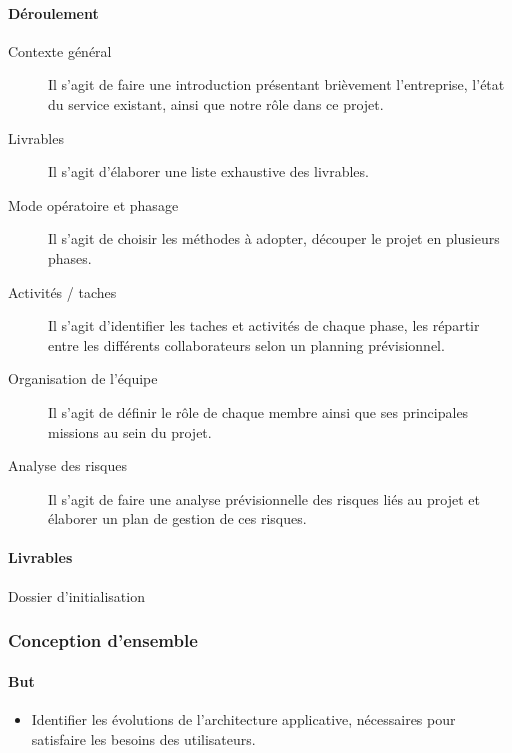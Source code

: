 \paragraph{Déroulement}
\begin{description}
    \item[Contexte général]{
        Il s’agit de faire une introduction présentant brièvement l’entreprise, l’état du service existant, ainsi que notre rôle dans ce projet.
    }
    \item[Livrables]{
        Il s’agit d’élaborer une liste exhaustive des livrables.
    }
    \item[Mode opératoire et phasage]{
        Il s’agit de choisir les méthodes à adopter, découper le projet en plusieurs phases.
    }
    \item[Activités / taches]{
        Il s’agit d’identifier les taches et activités de chaque phase, les répartir entre les différents collaborateurs selon un planning prévisionnel.
    }
    \item[Organisation de l’équipe]{
        Il s’agit de définir le rôle de chaque membre ainsi que ses principales missions au sein du projet.
    }
    \item[Analyse des risques]{
        Il s’agit de faire une analyse prévisionnelle des risques liés au projet et élaborer un plan de gestion de ces risques.
    }
\end{description}

\paragraph{Livrables}
Dossier d’initialisation

\subsubsection{Conception d'ensemble}

\paragraph{But}
\begin{itemize}
    \item Identifier les évolutions de l'architecture applicative, nécessaires pour satisfaire les besoins des utilisateurs.
\end{itemize}


